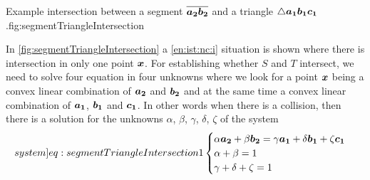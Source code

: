 \documentclass[dissertation.tex]{subfiles}
\begin{document}
\begin{myfig}{Example intersection between a segment
    $\overline{\boldsymbol{a_2}\boldsymbol{b_2}}$ and a triangle $\triangle \boldsymbol{a_1}\boldsymbol{b_1}\boldsymbol{c_1}$.}{fig:segmentTriangleIntersection}
\end{myfig}
In \cref{fig:segmentTriangleIntersection} a
\cref{en:ist:nc:i} situation is shown where there is intersection in
only one 
point $\boldsymbol{x}$. For establishing whether $S$ and $T$ intersect, we need to
solve 
four equation in four unknowns \cite{schneider} where we look for a point
$\boldsymbol{x}$ being a convex linear
combination of $\boldsymbol{a_2}$ and $\boldsymbol{b_2}$ and at the same time a convex
linear combination of $\boldsymbol{a_1}$,
$\boldsymbol{b_1}$ and $\boldsymbol{c_1}$. In other words when there is a collision,
then there is a solution for the unknowns
$\alpha$, $\beta$, $\gamma$, $\delta$, $\zeta$ of the system
\begin{equation}\label[system]{eq:segmentTriangleIntersection1}
  \begin{cases}
    \alpha \ve{a_2} + \beta\ve{b_2}=\gamma\ve{a_1}+\delta\ve{b_1}+\zeta\ve{c_1} \\
    \alpha + \beta = 1\\
    \gamma + \delta +\zeta=1
  \end{cases}
\end{equation}
\end{document}
